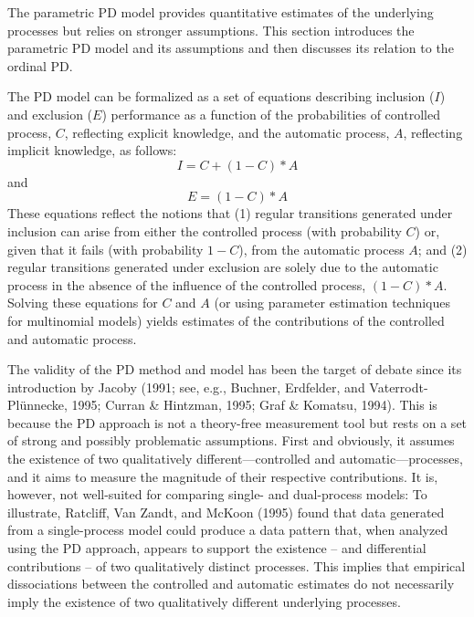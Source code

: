 \documentclass[man]{apa6}
\theoremstyle{definition}
\theoremstyle{definition}
\theoremstyle{definition}
\theoremstyle{remark}
\begin{document}
The parametric PD model provides quantitative estimates of the
underlying processes but relies on stronger assumptions. This section
introduces the parametric PD model and its assumptions and then
discusses its relation to the ordinal PD.

The PD model can be formalized as a set of equations describing
inclusion (\(I\)) and exclusion (\(E\)) performance as a function of the
probabilities of controlled process, \(C\), reflecting explicit
knowledge, and the automatic process, \(A\), reflecting implicit
knowledge, as follows: \[I=C+(1-C)*A\] and \[E=(1-C)*A\] These equations
reflect the notions that (1) regular transitions generated under
inclusion can arise from either the controlled process (with probability
\(C\)) or, given that it fails (with probability \(1-C\)), from the
automatic process \(A\); and (2) regular transitions generated under
exclusion are solely due to the automatic process in the absence of the
influence of the controlled process, \((1-C)*A\). Solving these
equations for \(C\) and \(A\) (or using parameter estimation techniques
for multinomial models) yields estimates of the contributions of the
controlled and automatic process.

The validity of the PD method and model has been the target of debate
since its introduction by Jacoby (1991; see, e.g., Buchner, Erdfelder,
and Vaterrodt-Plünnecke, 1995; Curran \& Hintzman, 1995; Graf \&
Komatsu, 1994). This is because the PD approach is not a theory-free
measurement tool but rests on a set of strong and possibly problematic
assumptions. First and obviously, it assumes the existence of two
qualitatively different---controlled and automatic---processes, and it
aims to measure the magnitude of their respective contributions. It is,
however, not well-suited for comparing single- and dual-process models:
To illustrate, Ratcliff, Van Zandt, and McKoon (1995) found that data
generated from a single-process model could produce a data pattern that,
when analyzed using the PD approach, appears to support the existence --
and differential contributions -- of two qualitatively distinct
processes. This implies that empirical dissociations between the
controlled and automatic estimates do not necessarily imply the
existence of two qualitatively different underlying processes.
\end{document}
